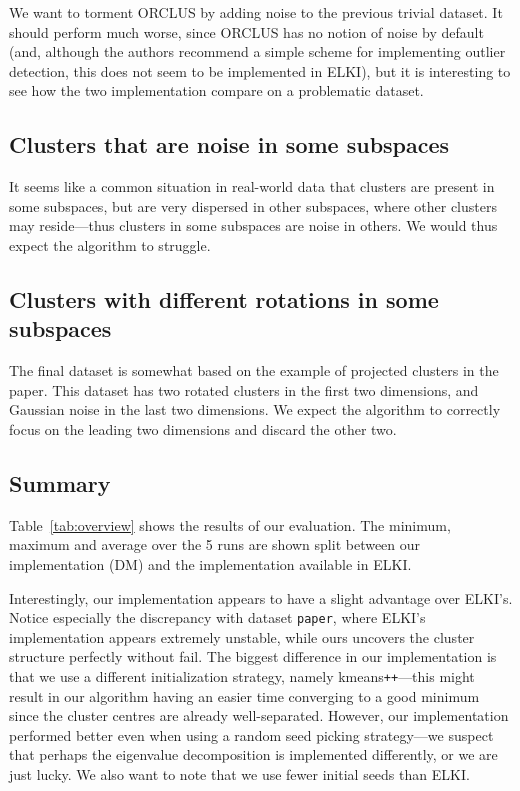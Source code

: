 \documentclass[english]{scrartcl}
\begin{document}
We want to torment ORCLUS by adding noise to the previous trivial dataset.
It should perform much worse, since ORCLUS has no notion of noise by default
(and, although the authors recommend a simple scheme for implementing outlier
detection, this does not seem to be implemented in ELKI), but it is interesting
to see how the two implementation compare on a problematic dataset.


\subsection{Clusters that are noise in some subspaces}

It seems like a common situation in real-world data that clusters are present
in some subspaces, but are very dispersed in other subspaces, where other
clusters may reside---thus clusters in some subspaces are noise in others. We
would thus expect the algorithm to struggle.


\subsection{Clusters with different rotations in some subspaces}

The final dataset is somewhat based on the example of projected clusters
in the paper. This dataset has two rotated clusters in the first two dimensions,
and Gaussian noise in the last two dimensions. We expect the algorithm to
correctly focus on the leading two dimensions and discard the other two.


\subsection{Summary}

Table~\ref{tab:overview} shows the results of our evaluation. The minimum,
maximum and average over the 5 runs are shown split between our implementation
(DM) and the implementation available in ELKI.

Interestingly, our implementation appears to have a slight advantage over
ELKI's.  Notice especially the discrepancy with dataset \texttt{paper}, where
ELKI's implementation appears extremely unstable, while ours uncovers the
cluster structure perfectly without fail. The biggest difference in our
implementation is that we use a different initialization strategy, namely
kmeans\texttt{++}---this might result in our algorithm having an easier time
converging to a good minimum since the cluster centres are already
well-separated. However, our implementation performed better even when using a
random seed picking strategy---we suspect that perhaps the eigenvalue
decomposition is implemented differently, or we are just lucky. We also want to
note that we use fewer initial seeds than ELKI.
\end{document}
